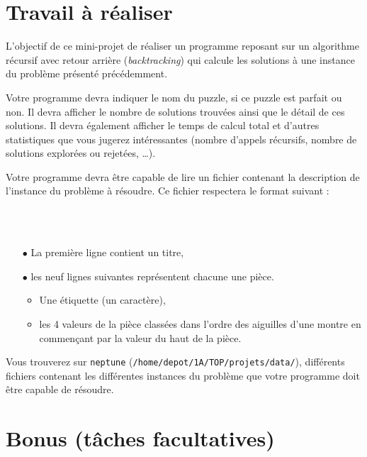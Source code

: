 \documentclass[10pt]{article}
\begin{document}
\section*{Travail à réaliser}

L'objectif de ce mini-projet de réaliser un programme reposant sur un algorithme récursif avec retour arrière (\emph{backtracking}) qui calcule les solutions à une instance du problème présenté précédemment.

Votre programme devra indiquer le nom du puzzle, si ce puzzle est parfait ou non. Il devra afficher le nombre de solutions trouvées ainsi que le détail de ces solutions. Il devra également afficher le temps de calcul total et d'autres statistiques que vous jugerez intéressantes (nombre d'appels récursifs, nombre de solutions explorées ou rejetées, \ldots).

Votre programme devra être capable de lire un fichier contenant la description de l'instance du problème à résoudre. Ce fichier respectera le format suivant : \\

~~~
\begin{minipage}{.3\linewidth}
\end{minipage}
~~~~
\begin{minipage}{.5\linewidth}
  \begin{itemize}
     \item[$\bullet$] La première ligne contient un titre,
     \item[$\bullet$] les neuf lignes suivantes représentent chacune une pièce.
     \begin{itemize}
	   \item Une étiquette (un caractère),
	   \item les 4 valeurs de la pièce classées dans l'ordre des aiguilles d'une montre en commençant par la valeur du haut de la pièce.  
	 \end{itemize}
  \end{itemize}
\vfill
\end{minipage}


Vous trouverez sur \texttt{neptune} (\verb+/home/depot/1A/TOP/projets/data/+), différents fichiers contenant les différentes instances du problème que votre programme doit être capable de résoudre.


\section*{Bonus (tâches facultatives)}
\end{document}
